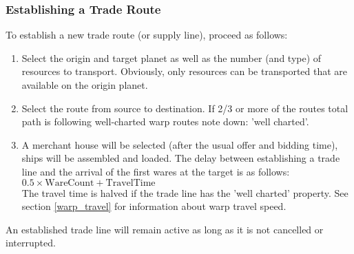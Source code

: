 \subsubsection{Establishing a Trade Route} 
To establish a new trade route (or supply line), proceed as follows: 
\begin{enumerate} 
\item Select the origin and target planet as well as the number (and type) of resources to transport. Obviously, only resources can be transported that are available on the origin planet. 
\item Select the route from source to destination. If 2/3 or more of the routes total path is following well-charted warp routes note down: 'well charted'. 
\item A merchant house will be selected (after the usual offer and bidding time), ships will be assembled and loaded. The delay between establishing a trade line and the arrival of the first wares at the target is as follows: \\ 
$0.5 \times \text{WareCount} + \text{TravelTime}$\\ 
The travel time is halved if the trade line has the 'well charted' property. See section \ref{warp_travel} for information about warp travel speed. 
\end{enumerate} 
An established trade line will remain active as long as it is not cancelled or interrupted. 
